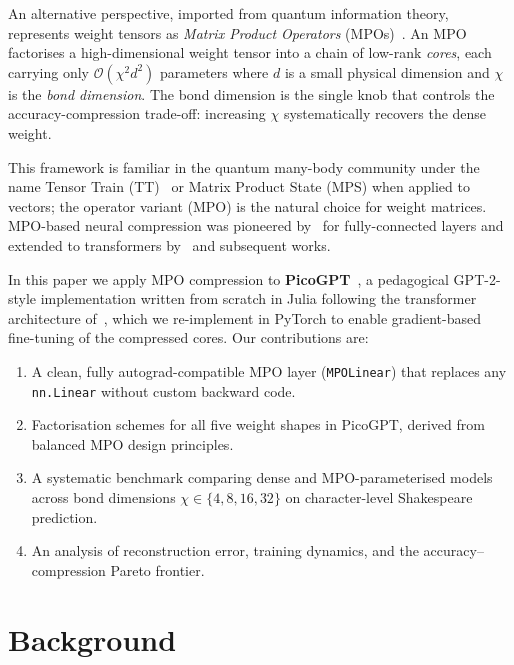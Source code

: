 \documentclass[11pt,a4paper]{article}
\theoremstyle{definition}
\begin{document}
An alternative perspective, imported from quantum information theory, represents weight tensors as \emph{Matrix Product Operators} (MPOs)~\citep{oseledets2011tensor,novikov2015tensorizing}. An MPO factorises a high-dimensional weight tensor into a chain of low-rank \emph{cores}, each carrying only $\mathcal{O}(\chi^2 d^2)$ parameters where $d$ is a small physical dimension and $\chi$ is the \emph{bond dimension}. The bond dimension is the single knob that controls the accuracy-compression trade-off: increasing $\chi$ systematically recovers the dense weight.

This framework is familiar in the quantum many-body community under the name Tensor Train (TT)~\citep{oseledets2011tensor} or Matrix Product State (MPS) when applied to vectors; the operator variant (MPO) is the natural choice for weight matrices. MPO-based neural compression was pioneered by~\citet{novikov2015tensorizing} for fully-connected layers and extended to transformers by~\citet{gao2020compressing} and subsequent works.

In this paper we apply MPO compression to \textbf{PicoGPT}~\citep{osborne2024picogpt,vaswani2017attention}, a pedagogical GPT-2-style implementation written from scratch in Julia following the transformer architecture of~\citet{vaswani2017attention}, which we re-implement in PyTorch to enable gradient-based fine-tuning of the compressed cores. Our contributions are:
\begin{enumerate}[itemsep=2pt]
  \item A clean, fully autograd-compatible MPO layer (\texttt{MPOLinear}) that replaces any \texttt{nn.Linear} without custom backward code.
  \item Factorisation schemes for all five weight shapes in PicoGPT, derived from balanced MPO design principles.
  \item A systematic benchmark comparing dense and MPO-parameterised models across bond dimensions $\chi \in \{4,8,16,32\}$ on character-level Shakespeare prediction.
  \item An analysis of reconstruction error, training dynamics, and the accuracy--compression Pareto frontier.
\end{enumerate}


\section{Background}
\end{document}
